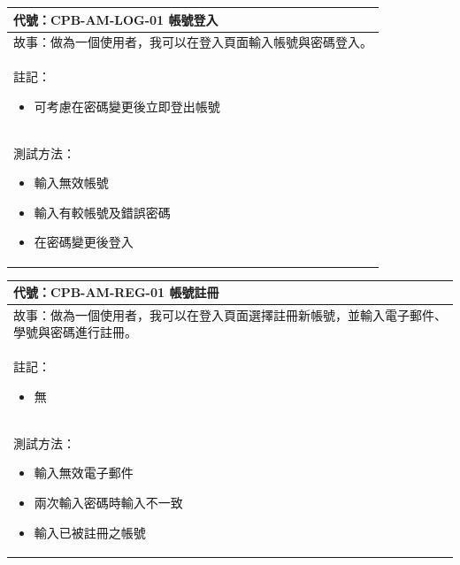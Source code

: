 \documentclass{article}
\begin{document}
\begin{table}[H]
	\begin{tabular}{| m{13cm} |}
		\hline
		代號：CPB-AM-LOG-01	帳號登入         \\ \hline
		故事：做為一個使用者，我可以在登入頁面輸入帳號與密碼登入。 \\	\hline
		註記：
		\begin{itemize}
			\item 可考慮在密碼變更後立即登出帳號
		\end{itemize}          \\ \hline
		測試方法：
		\begin{itemize}
			\item 輸入無效帳號
			\item 輸入有較帳號及錯誤密碼
			\item 在密碼變更後登入
		\end{itemize}
		\\	\hline
	\end{tabular}
\end{table}

\begin{table}[H]
	\begin{tabular}{| m{13cm} |}
		\hline
		代號：CPB-AM-REG-01	帳號註冊                         \\ \hline
		故事：做為一個使用者，我可以在登入頁面選擇註冊新帳號，並輸入電子郵件、學號與密碼進行註冊。 \\	\hline
		註記：
		\begin{itemize}
			\item 無
		\end{itemize}                                \\ \hline
		測試方法：
		\begin{itemize}
			\item 輸入無效電子郵件
			\item 兩次輸入密碼時輸入不一致
			\item 輸入已被註冊之帳號
		\end{itemize}
		\\	\hline
	\end{tabular}
\end{table}
\end{document}
